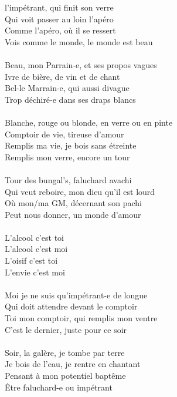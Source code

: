 
 l'impétrant, qui finit son verre
\\Qui voit passer au loin l'apéro
\\Comme l'apéro, où il se ressert
\\Vois comme le monde, le monde est beau
\\\\Beau, mon Parrain-e, et ses propos vagues
\\Ivre de bière, de vin et de chant
\\Bel-le Marrain-e, qui aussi divague
\\Trop déchiré-e dans ses draps blancs
\\\\Blanche, rouge ou blonde, en verre ou en pinte
\\Comptoir de vie, tireuse d'amour
\\Remplis ma vie, je bois sans étreinte
\\Remplis mon verre, encore un tour
\\\\Tour des bungal's, faluchard avachi
\\Qui veut reboire, mon dieu qu'il est lourd
\\Où mon/ma GM, décernant son pachi
\\Peut nous donner, un monde d'amour
\\\\L'alcool c'est toi
\\L'alcool c'est moi
\\L'oisif c'est toi
\\L'envie c'est moi
\\\\Moi je ne suis qu'impétrant-e de longue
\\Qui doit attendre devant le comptoir
\\Toi mon comptoir, qui remplis mon ventre
\\C'est le dernier, juste pour ce soir
\\\\Soir, la galère, je tombe par terre
\\Je bois de l'eau, je rentre en chantant
\\Pensant à mon potentiel baptême
\\Être faluchard-e ou impétrant
\breakpage
